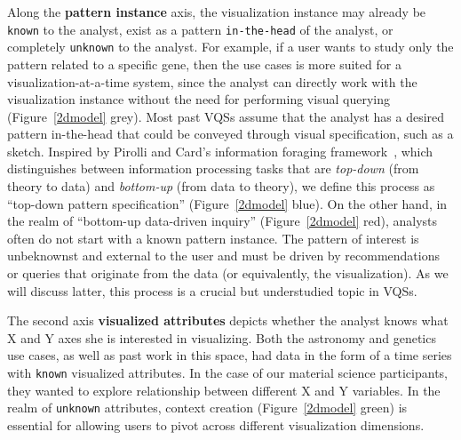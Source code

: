 \par Along the \textbf{pattern instance} axis, the visualization instance may already be \texttt{known} to the analyst, exist as a pattern \texttt{in-the-head} of the analyst, or completely \texttt{unknown} to the analyst. For example, if a user wants to study only the pattern related to a specific gene, then the use cases is more suited for a visualization-at-a-time system, since the analyst can directly work with the visualization instance without the need for performing visual querying (Figure~\ref{2dmodel} grey). Most past VQSs assume that the analyst has a desired pattern in-the-head that could be conveyed through visual specification, such as a sketch. Inspired by Pirolli and Card's information foraging framework~\cite{Pirolli}, which distinguishes between information processing tasks that are \textit{top-down} (from theory to data) and \textit{bottom-up} (from data to theory), we define this process as ``top-down pattern specification'' (Figure~\ref{2dmodel} blue). On the other hand, in the realm of ``bottom-up data-driven inquiry'' (Figure~\ref{2dmodel} red), analysts often do not start with a known pattern instance. The pattern of interest is unbeknownst and external to the user and must be driven by recommendations or queries that originate from the data (or equivalently, the visualization). As we will discuss latter, this process is a crucial but understudied topic in VQSs.
\par The second axis \textbf{visualized attributes} depicts whether the analyst knows what X and Y axes she is interested in visualizing. Both the astronomy and genetics use cases, as well as past work in this space, had data in the form of a time series with \texttt{known} visualized attributes. In the case of our material science participants, they wanted to explore relationship between different X and Y variables. In the realm of \texttt{unknown} attributes, context creation (Figure~\ref{2dmodel} green) is essential for allowing users to pivot across different visualization dimensions.
